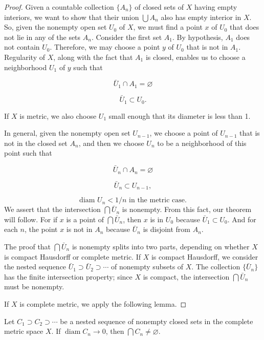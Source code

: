 \begin{proof}
Given a countable collection \(\{ A_{n}\}\) of closed sets of \(X\) having empty interiors, we want to show that their union \(\bigcup {A}_{n}\) also has empty interior in \(X\). So, given the nonempty open set \(U_{0}\) of \(X\), we must find a point \(x\) of \(U_{0}\) that does not lie in any of the sets \(A_{n}\).
Consider the first set \(A_{1}\). By hypothesis, \(A_{1}\) does not contain \(U_{0}\). Therefore, we may choose a point \(y\) of \(U_{0}\) that is not in \(A_{1}\). Regularity of \(X\), along with the fact that \(A_{1}\) is closed, enables us to choose a neighborhood \(U_{1}\) of \(y\) such that

\[
\bar{U}_{1} \cap {A}_{1} = \varnothing
\]

\[
\bar{U}_{1} \subset {U}_{0}\text{.}
\]

If \(X\) is metric, we also choose \(U_{1}\) small enough that its diameter is less than 1.

In general, given the nonempty open set \(U_{n - 1}\), we choose a point of \(U_{n - 1}\) that is not in the closed set \(A_{n}\), and then we choose \(U_{n}\) to be a neighborhood of this point such that

\[
\bar{U}_{n} \cap {A}_{n} = \varnothing
\]

\[
\bar{U}_{n} \subset {U}_{n - 1},
\]

\[
\text{ diam }U_{n} < 1/n\text{ in the metric case. }
\]
We assert that the intersection \(\bigcap {\bar{U}}_{n}\) is nonempty. From this fact, our theorem will follow. For if \(x\) is a point of \(\bigcap {\bar{U}}_{n}\), then \(x\) is in \(U_{0}\) because \(\bar{U}_{1} \subset {U}_{0}\). And for each \(n\), the point \(x\) is not in \(A_{n}\) because \(\bar{U}_{n}\) is disjoint from \(A_{n}\).

The proof that \(\bigcap {\bar{U}}_{n}\) is nonempty splits into two parts, depending on whether \(X\) is compact Hausdorff or complete metric. If \(X\) is compact Hausdorff, we consider the nested sequence \(\bar{U}_{1} \supset {\bar{U}}_{2} \supset \cdots\) of nonempty subsets of \(X\). The collection \(\{ \bar{U}_{n}\}\) has the finite intersection property; since \(X\) is compact, the intersection \(\bigcap {\bar{U}}_{n}\) must be nonempty.

If \(X\) is complete metric, we apply the following lemma.
\end{proof}
\begin{lemma}
\label{lem:\thetheorem}
Let \(C_{1} \supset {C}_{2} \supset \cdots\) be a nested sequence of nonempty closed sets in the complete metric space \(X\). If \(\operatorname{diam}C_{n} \rightarrow 0\), then \(\bigcap {C}_{n} \neq \varnothing\).
\end{lemma}

